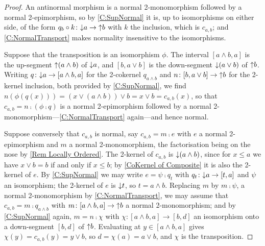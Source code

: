 \begin{proof}
  \leanok
  An antinormal morphism is a normal 2-monomorphism followed by a normal 2-epimorphism, so by \corx\ref{C:SupNormal} it is, up to isomorphisms on either side, of the form \(q_{b}\circ k\colon{\downarrow}a\to{\uparrow}b\) with \(k\) the inclusion, which is \(c_{a,b}\); and \corx\ref{C:NormalTransport} makes normality insensitive to the isomorphisms.

	Suppose that the transposition is an isomorphism \(\phi\). The interval \([a\wedge b,a]\) is the up-segment \({\uparrow}(a\wedge b)\) of \({\downarrow}a\), and \([b,a\vee b]\) is the down-segment \({\downarrow}(a\vee b)\) of \({\uparrow}b\). Writing \(q\colon{\downarrow}a\to[a\wedge b,a]\) for the 2-cokernel \(q_{a\wedge b}\) and \(n\colon[b,a\vee b]\to{\uparrow}b\) for the 2-kernel inclusion, both provided by \corx\ref{C:SupNormal}, we find \(n(\phi(q(x)))=(x\vee(a\wedge b))\vee b=x\vee b=c_{a,b}(x)\), so that \(c_{a,b}=n\comp(\phi\comp q)\) is a normal 2-epimorphism followed by a normal 2-monomorphism---\corx\ref{C:NormalTransport} again---and hence normal.

	Suppose conversely that \(c_{a,b}\) is normal, say \(c_{a,b}=m\comp e\) with \(e\) a normal 2-epimorphism and \(m\) a normal 2-monomorphism, the factorisation being on the nose by \remx\ref{Rem Locally Ordered}. The 2-kernel of \(c_{a,b}\) is \({\downarrow}(a\wedge b)\), since for \(x\leq a\) we have \(x\vee b=b\) if and only if \(x\leq b\); by \prox\ref{CoKernel of Composite} it is also the 2-kernel of \(e\). By \corx\ref{C:SupNormal} we may write \(e=\psi\comp q_{t}\) with \(q_{t}\colon{\downarrow}a\to[t,a]\) and \(\psi\) an isomorphism; the 2-kernel of \(e\) is \({\downarrow}t\), so \(t=a\wedge b\). Replacing \(m\) by \(m\comp\psi\), a normal 2-monomorphism by \corx\ref{C:NormalTransport}, we may assume that \(c_{a,b}=m\comp q_{a\wedge b}\) with \(m\colon[a\wedge b,a]\to{\uparrow}b\) a normal 2-monomorphism; and by \corx\ref{C:SupNormal} again, \(m=n\comp\chi\) with \(\chi\colon[a\wedge b,a]\to[b,d]\) an isomorphism onto a down-segment \([b,d]\) of \({\uparrow}b\). Evaluating at \(y\in[a\wedge b,a]\) gives \(\chi(y)=c_{a,b}(y)=y\vee b\), so \(d=\chi(a)=a\vee b\), and \(\chi\) is the transposition.
\end{proof}

